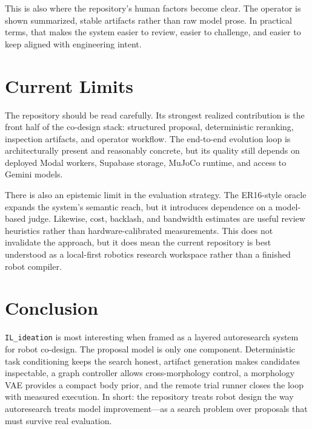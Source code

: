 \documentclass[10pt,letterpaper,twocolumn]{article}
\begin{document}
This is also where the repository's human factors become clear. The operator is shown summarized, stable artifacts rather than raw model prose. In practical terms, that makes the system easier to review, easier to challenge, and easier to keep aligned with engineering intent.

\section{Current Limits}

The repository should be read carefully. Its strongest realized contribution is the front half of the co-design stack: structured proposal, deterministic reranking, inspection artifacts, and operator workflow. The end-to-end evolution loop is architecturally present and reasonably concrete, but its quality still depends on deployed Modal workers, Supabase storage, MuJoCo runtime, and access to Gemini models.

There is also an epistemic limit in the evaluation strategy. The ER16-style oracle expands the system's semantic reach, but it introduces dependence on a model-based judge. Likewise, cost, backlash, and bandwidth estimates are useful review heuristics rather than hardware-calibrated measurements. This does not invalidate the approach, but it does mean the current repository is best understood as a local-first robotics research workspace rather than a finished robot compiler.

\section{Conclusion}

\texttt{IL\_ideation} is most interesting when framed as a layered autoresearch system for robot co-design. The proposal model is only one component. Deterministic task conditioning keeps the search honest, artifact generation makes candidates inspectable, a graph controller allows cross-morphology control, a morphology VAE provides a compact body prior, and the remote trial runner closes the loop with measured execution. In short: the repository treats robot design the way autoresearch treats model improvement---as a search problem over proposals that must survive real evaluation.
\end{document}
